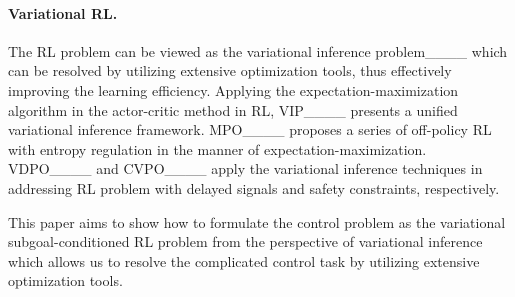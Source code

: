 \paragraph{Variational RL.}
The RL problem can be viewed as the variational inference problem____ which can be resolved by utilizing extensive optimization tools, thus effectively improving the learning efficiency.
Applying the expectation-maximization algorithm in the actor-critic method in RL, VIP____ presents a unified variational inference framework.
MPO____ proposes a series of off-policy RL with entropy regulation in the manner of expectation-maximization. VDPO____ and CVPO____ apply the variational inference techniques in addressing RL problem with delayed signals and safety constraints, respectively.

This paper aims to show how to formulate the control problem as the variational subgoal-conditioned RL problem from the perspective of variational inference which allows us to resolve the complicated control task by utilizing extensive optimization tools.


